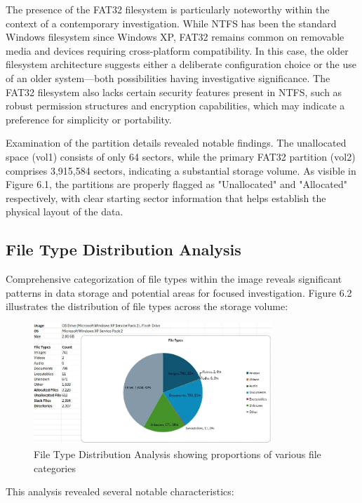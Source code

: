 The presence of the FAT32 filesystem is particularly noteworthy within the context of a contemporary investigation. While NTFS has been the standard Windows filesystem since Windows XP, FAT32 remains common on removable media and devices requiring cross-platform compatibility. In this case, the older filesystem architecture suggests either a deliberate configuration choice or the use of an older system—both possibilities having investigative significance. The FAT32 filesystem also lacks certain security features present in NTFS, such as robust permission structures and encryption capabilities, which may indicate a preference for simplicity or portability.

Examination of the partition details revealed notable findings. The unallocated space (vol1) consists of only 64 sectors, while the primary FAT32 partition (vol2) comprises 3,915,584 sectors, indicating a substantial storage volume. As visible in Figure 6.1, the partitions are properly flagged as "Unallocated" and "Allocated" respectively, with clear starting sector information that helps establish the physical layout of the data.

\subsection{File Type Distribution Analysis}
Comprehensive categorization of file types within the image reveals significant patterns in data storage and potential areas for focused investigation. Figure 6.2 illustrates the distribution of file types across the storage volume:

\begin{figure}[htbp]
    \centering
    \includegraphics[width=0.8\textwidth]{images/Evidence Examination/Image2.png}
    \caption{File Type Distribution Analysis showing proportions of various file categories}
    \label{fig:file_types}
\end{figure}

This analysis revealed several notable characteristics:

